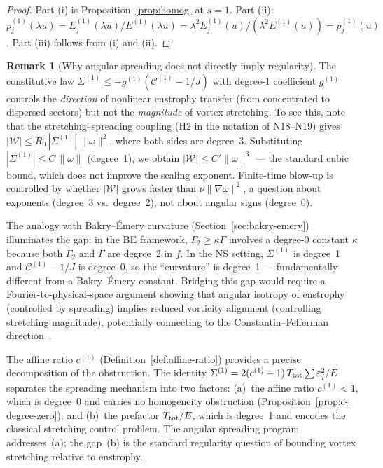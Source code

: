 \documentclass[11pt]{article}
\theoremstyle{definition}
\newtheorem{remark}[theorem]{Remark}
\newcommand{\cC}{\mathcal{C}}
\begin{document}
\begin{proof}
Part (i) is Proposition~\ref{prop:homog} at $s=1$.
Part (ii): $p_j^{(1)}(\lambda u)
= E_j^{(1)}(\lambda u)/E^{(1)}(\lambda u)
= \lambda^2 E_j^{(1)}(u)/(\lambda^2 E^{(1)}(u))
= p_j^{(1)}(u)$.  Part (iii) follows from (i) and (ii).
\end{proof}

\begin{remark}[Why angular spreading does not
directly imply regularity]
\label{rem:obstruction}
The constitutive law $\Sigma^{(1)}\leq
-g^{(1)}(\cC^{(1)}-1/J)$ with degree-1
coefficient $g^{(1)}$ controls the
\emph{direction} of nonlinear enstrophy transfer
(from concentrated to dispersed sectors) but not
the \emph{magnitude} of vortex stretching.  To see
this, note that the stretching--spreading coupling
(H2 in the notation of N18--N19) gives
$|\mathcal{W}| \leq R_0\,|\Sigma^{(1)}|\,
\|\omega\|^2$, where both sides are degree~3.
Substituting $|\Sigma^{(1)}| \leq
C\,\|\omega\|$ (degree~1), we obtain
$|\mathcal{W}| \leq C'\|\omega\|^3$ --- the
standard cubic bound, which does not improve
the scaling exponent.  Finite-time blow-up is
controlled by whether $|\mathcal{W}|$ grows
faster than $\nu\|\nabla\omega\|^2$, a
question about exponents (degree~3 vs.\
degree~2), not about angular signs (degree~0).

The analogy with Bakry--\'Emery curvature
(Section~\ref{sec:bakry-emery}) illuminates
the gap: in the BE framework, $\Gamma_2\geq
\kappa\Gamma$ involves a degree-0 constant
$\kappa$ because both $\Gamma_2$ and $\Gamma$
are degree~2 in $f$.  In the NS setting,
$\Sigma^{(1)}$ is degree~1 and
$\cC^{(1)}-1/J$ is degree~0, so the
``curvature'' is degree~1 --- fundamentally
different from a Bakry--\'Emery constant.
Bridging this gap would require a
Fourier-to-physical-space argument showing that
angular isotropy of enstrophy (controlled by
spreading) implies reduced vorticity alignment
(controlling stretching magnitude), potentially
connecting to the Constantin--Fefferman
direction~\cite{CF93}.

The affine ratio $c^{(1)}$
(Definition~\ref{def:affine-ratio}) provides a
precise decomposition of the obstruction.
The identity $\Sigma^{(1)} = 2(c^{(1)}-1)\,
T_{\rm tot}\sum\varepsilon_j^2/E$ separates
the spreading mechanism into two factors:
(a)~the affine ratio $c^{(1)}<1$, which is
degree~0 and carries no homogeneity obstruction
(Proposition~\ref{prop:c-degree-zero}); and
(b)~the prefactor $T_{\rm tot}/E$, which is
degree~1 and encodes the classical stretching
control problem.  The angular spreading program
addresses~(a); the gap~(b) is the standard
regularity question of bounding vortex stretching
relative to enstrophy.
\end{remark}
\end{document}
